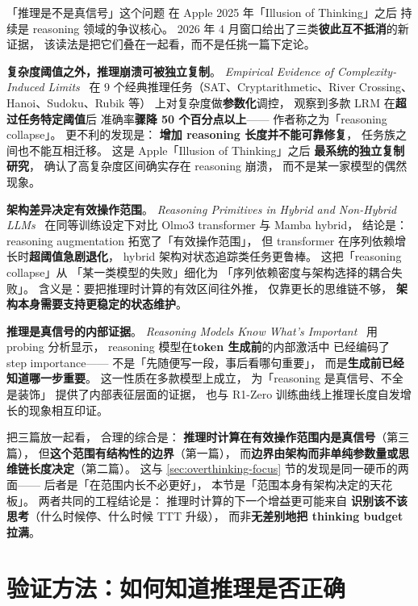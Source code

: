 「推理是不是真信号」这个问题
在 Apple 2025 年「Illusion of Thinking」之后
持续是 reasoning 领域的争议核心。
2026 年 4 月窗口给出了三类\textbf{彼此互不抵消}的新证据，
该读法是把它们叠在一起看，而不是任挑一篇下定论。

\textbf{复杂度阈值之外，推理崩溃可被独立复制}。
\textit{Empirical Evidence of Complexity-Induced Limits}~\cite{complexitylimits2026}
在 9 个经典推理任务（SAT、Cryptarithmetic、River Crossing、Hanoi、Sudoku、Rubik 等）
上对复杂度做\textbf{参数化}调控，
观察到多款 LRM 在\textbf{超过任务特定阈值}后
准确率\textbf{骤降 50 个百分点以上}——
作者称之为「reasoning collapse」。
更不利的发现是：
\textbf{增加 reasoning 长度并不能可靠修复}，
任务族之间也不能互相迁移。
这是 Apple「Illusion of Thinking」之后
\textbf{最系统的独立复制研究}，
确认了高复杂度区间确实存在 reasoning 崩溃，
而不是某一家模型的偶然现象。

\textbf{架构差异决定有效操作范围}。
\textit{Reasoning Primitives in Hybrid and Non-Hybrid LLMs}~\cite{reasoningprimitives2026}
在同等训练设定下对比 Olmo3 transformer 与 Mamba hybrid，
结论是：
reasoning augmentation 拓宽了「有效操作范围」，
但 transformer 在序列依赖增长时\textbf{超阈值急剧退化}，
hybrid 架构对状态追踪类任务更鲁棒。
这把「reasoning collapse」从
「某一类模型的失败」细化为
「序列依赖密度与架构选择的耦合失败」。
含义是：要把推理时计算的有效区间往外推，
仅靠更长的思维链不够，
\textbf{架构本身需要支持更稳定的状态维护}。

\textbf{推理是真信号的内部证据}。
\textit{Reasoning Models Know What's Important}~\cite{reasoningknowimportant2026}
用 probing 分析显示，
reasoning 模型在\textbf{token 生成前}的内部激活中
已经编码了 step importance——
不是「先随便写一段，事后看哪句重要」，
而是\textbf{生成前已经知道哪一步重要}。
这一性质在多款模型上成立，
为「reasoning 是真信号、不全是装饰」
提供了内部表征层面的证据，
也与 R1-Zero 训练曲线上推理长度自发增长的现象相互印证。

把三篇放一起看，
合理的综合是：
\textbf{推理时计算在有效操作范围内是真信号}（第三篇），
但\textbf{这个范围有结构性的边界}（第一篇），
而\textbf{边界由架构而非单纯参数量或思维链长度决定}（第二篇）。
这与 \ref{sec:overthinking-focus} 节的发现是同一硬币的两面——
后者是「在范围内长不必更好」，
本节是「范围本身有架构决定的天花板」。
两者共同的工程结论是：
推理时计算的下一个增益更可能来自
\textbf{识别该不该思考}（什么时候停、什么时候 TTT 升级），
而非\textbf{无差别地把 thinking budget 拉满}。


\section{验证方法：如何知道推理是否正确}

